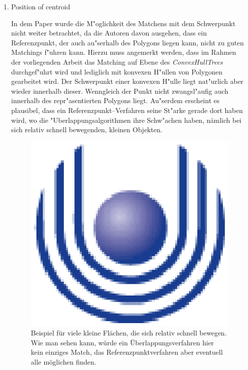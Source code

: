 \begin{enumerate}
\item Position of centroid

In dem Paper wurde die M"oglichkeit des Matchens mit dem Schwerpunkt nicht weiter betrachtet, da die Autoren davon ausgehen, dass ein Referenzpunkt, der auch au"serhalb des Polygons liegen kann, nicht zu guten Matchings f"uhren kann. Hierzu muss angemerkt werden, dass im Rahmen der vorliegenden Arbeit das Matching auf Ebene des \textit{ConvexHullTrees} durchgef"uhrt wird und lediglich mit konvexen H"ullen von Polygonen gearbeitet wird. Der Schwerpunkt einer konvexen H"ulle liegt nat"urlich aber wieder innerhalb dieser. Wenngleich der Punkt nicht zwangsl"aufig auch innerhalb des repr"asentierten Polygons liegt. Au"serdem erscheint es plausibel, dass ein Referenzpunkt--Verfahren seine St"arke gerade dort haben wird, wo die "Uberlappungsalgorithmen ihre Schw"achen haben, nämlich bei sich relativ schnell bewegenden, kleinen Objekten.

\begin{figure}
	\centering
	\includegraphics{feu_logo2.eps}
	\caption[Beispiel für den Vorteil von Referenzpunktverfahren]{Beispiel für viele kleine Flächen, die sich relativ schnell bewegen. Wie man sehen kann, würde ein Überlappungsverfahren hier kein einziges Match, das Referenzpunktverfahren aber eventuell alle möglichen finden.}
	\label{fig:SchnelleBewegung}
\end{figure}



\end{enumerate}
